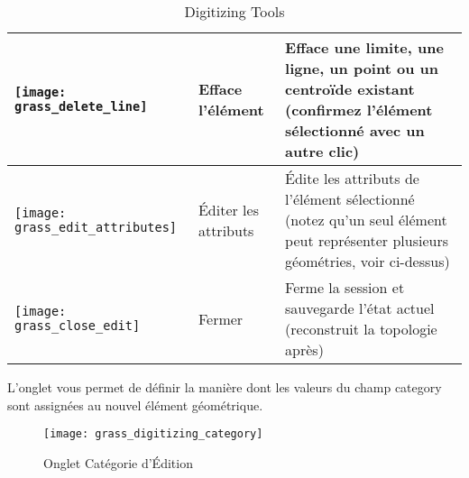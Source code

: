 {{\begin{table}[p]
\begin{tabular}{|m{1cm}|m{4cm}|m{8.5cm}|}
\hline \texttt{[image: grass\_delete\_line]} & Efface l'élément & Efface une limite, une ligne, un point ou un centroïde existant (confirmez l'élément sélectionné avec un autre clic)\\
\hline \texttt{[image: grass\_edit\_attributes]} & Éditer les attributs & Édite les attributs de l'élément sélectionné (notez qu'un seul élément peut représenter plusieurs géométries, voir ci-dessus)\\
\hline \texttt{[image: grass\_close\_edit]} & Fermer & Ferme la session et sauvegarde l'état actuel (reconstruit la topologie après)\\
\hline
\end{tabular}
\caption{\grass Digitizing Tools}\label{tab:grass_tools}
\end{table}}

L'onglet  vous permet de définir la manière dont les valeurs du champ category sont assignées au nouvel élément géométrique.

\begin{figure}[ht]
 \begin{center}
  \texttt{[image: grass\_digitizing\_category]}
  \caption{Onglet Catégorie d'Édition \grass \nixcaption}\label{fig:grass_digitizing_category}
 \end{center}
\end{figure}

}
